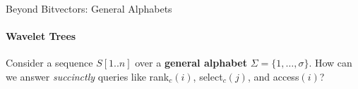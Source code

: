 \begin{frame}{Beyond Bitvectors: General Alphabets}
    \framesubtitle{Wavelet Trees}
    \vspace{-0.2em}
    Consider a sequence $S[1..n]$ over a \textbf{general alphabet} $\Sigma = \{1, \dots, \sigma\}$. How can we answer \emph{succinctly} queries like \textsf{rank}$_c(i)$, \textsf{select}$_c(j)$, and \textsf{access}$(i)$?
    \begin{figure}[hbtp]
        \centering
    \end{figure}
\end{frame}
